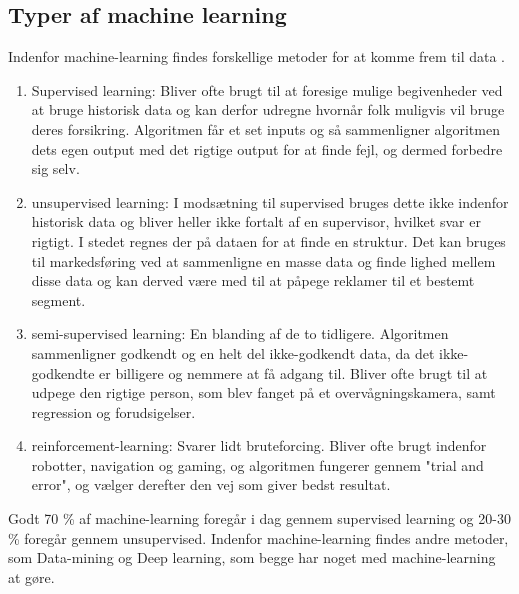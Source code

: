 \subsection{Typer af machine learning}
Indenfor machine-learning findes forskellige metoder for at komme frem til data \cite{MachineLearning}. 

	\begin{enumerate}
		\item Supervised learning: 	Bliver ofte brugt til at foresige mulige begivenheder ved at bruge historisk data og kan derfor udregne hvornår folk muligvis vil bruge deres forsikring. Algoritmen får et set inputs og så sammenligner algoritmen dets egen output med det rigtige output for at finde fejl, og dermed forbedre sig selv.
		\item unsupervised learning: I modsætning til supervised bruges dette ikke indenfor historisk data og bliver heller ikke fortalt af en supervisor, hvilket svar er rigtigt. I stedet regnes der på dataen for at finde en struktur. Det kan bruges til markedsføring ved at sammenligne en masse data og finde lighed mellem disse data og kan derved være med til at påpege reklamer til et bestemt segment.
		\item semi-supervised learning: En blanding af de to tidligere. Algoritmen sammenligner godkendt og en helt del ikke-godkendt data, da det ikke-godkendte er billigere og nemmere at få adgang til. Bliver ofte brugt til at udpege den rigtige person, som blev fanget på et overvågningskamera, samt regression og forudsigelser.
		\item reinforcement-learning: Svarer lidt bruteforcing. Bliver ofte brugt indenfor robotter, navigation og gaming, og algoritmen fungerer gennem "trial and error", og vælger derefter den vej som giver bedst resultat.
	\end{enumerate}
Godt 70 \% af machine-learning foregår i dag gennem supervised learning og 20-30 \% foregår gennem unsupervised. Indenfor machine-learning findes andre metoder, som Data-mining og Deep learning, som begge har noget med machine-learning at gøre. 
